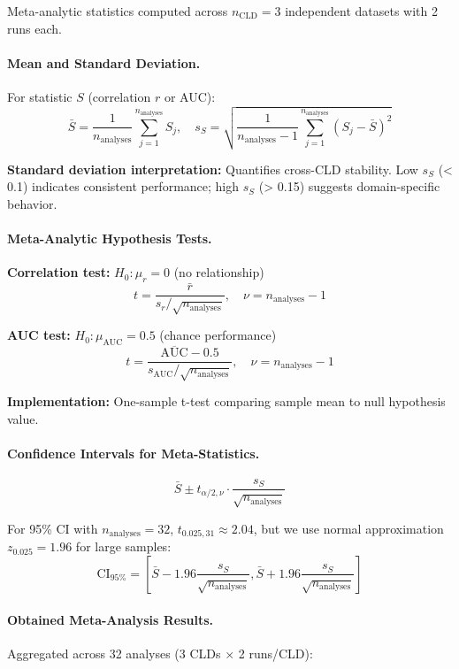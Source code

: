 Meta-analytic statistics computed across \(n_{\text{CLD}} = 3\) independent datasets with 2 runs each.

\paragraph{Mean and Standard Deviation.} For statistic \(S\) (correlation \(r\) or AUC):
\[
\bar{S} = \frac{1}{n_{\text{analyses}}}\sum_{j=1}^{n_{\text{analyses}}} S_j, \quad s_S = \sqrt{\frac{1}{n_{\text{analyses}}-1}\sum_{j=1}^{n_{\text{analyses}}}(S_j - \bar{S})^2}
\]

\textbf{Standard deviation interpretation:} Quantifies cross-CLD stability. Low \(s_S\) (< 0.1) indicates consistent performance; high \(s_S\) (> 0.15) suggests domain-specific behavior.

\paragraph{Meta-Analytic Hypothesis Tests.}

\textbf{Correlation test:} \(H_0: \mu_r = 0\) (no relationship)
\[
t = \frac{\bar{r}}{s_r / \sqrt{n_{\text{analyses}}}}, \quad \nu = n_{\text{analyses}} - 1
\]

\textbf{AUC test:} \(H_0: \mu_{\text{AUC}} = 0.5\) (chance performance)
\[
t = \frac{\overline{\text{AUC}} - 0.5}{s_{\text{AUC}} / \sqrt{n_{\text{analyses}}}}, \quad \nu = n_{\text{analyses}} - 1
\]

\textbf{Implementation:} One-sample t-test comparing sample mean to null hypothesis value.

\paragraph{Confidence Intervals for Meta-Statistics.}
\[
\bar{S} \pm t_{\alpha/2, \nu} \cdot \frac{s_S}{\sqrt{n_{\text{analyses}}}}
\]

For 95\% CI with \(n_{\text{analyses}} = 32\), \(t_{0.025, 31} \approx 2.04\), but we use normal approximation \(z_{0.025} = 1.96\) for large samples:
\[
\text{CI}_{95\%} = \left[\bar{S} - 1.96\frac{s_S}{\sqrt{n_{\text{analyses}}}}, \bar{S} + 1.96\frac{s_S}{\sqrt{n_{\text{analyses}}}}\right]
\]

\paragraph{Obtained Meta-Analysis Results.} Aggregated across 32 analyses (3 CLDs \(\times\) 2 runs/CLD):

